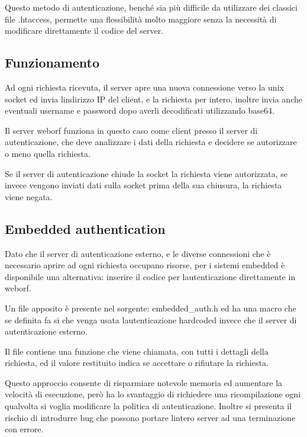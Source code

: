 \documentclass[a4paper,11pt]{article}
\begin{document}
{\sffamily
Questo metodo di autenticazione, bench\'e sia pi\`u difficile da
utilizzare dei classici file .htaccess, permette una flessibilit\`a
molto maggiore senza la necessit\`a di modificare direttamente il
codice del server.}


\bigskip

\subsection{Funzionamento}
{\sffamily
Ad ogni richiesta ricevuta, il server apre una nuova connessione verso
la unix socket ed invia l{\textquotesingle}indirizzo IP del client, e
la richiesta per intero, inoltre invia anche eventuali username e
password dopo averli decodificati utilizzando base64.}

{\sffamily
Il server weborf funziona in questo caso come client presso il server di
autenticazione, che deve analizzare i dati della richiesta e decidere
se autorizzare o meno quella richiesta.}

{\sffamily
Se il server di autenticazione chiude la socket la richiesta viene
autorizzata, se invece vengono inviati dati sulla socket prima della
sua chiusura, la richiesta viene negata.}


\bigskip

\subsection{Embedded authentication}
{\sffamily
Dato che il server di autenticazione esterno, e le diverse connessioni
che \`e necessario aprire ad ogni richiesta occupano risorse, per i
sistemi embedded \`e disponibile una alternativa: inserire il codice
per l{\textquotesingle}autenticazione direttamente in weborf.}

{\sffamily
Un file apposito \`e presente nel sorgente: embedded\_auth.h ed ha una
macro che se definita fa si che venga usata
l{\textquotesingle}autenticazione hardcoded invece che il server di
autenticazione esterno.}


\bigskip

{\sffamily
Il file contiene una funzione che viene chiamata, con tutti i dettagli
della richiesta, ed il valore restituito indica se accettare o
rifiutare la richiesta.}


\bigskip

{\sffamily
Questo approccio consente di risparmiare notevole memoria ed aumentare
la velocit\`a di esecuzione, per\`o ha lo svantaggio di richiedere una
ricompilazione ogni qualvolta si voglia modificare la politica di
autenticazione. Inoltre si presenta il rischio di introdurre bug che
possono portare l{\textquotesingle}intero server ad una terminazione
con errore.}
\end{document}
